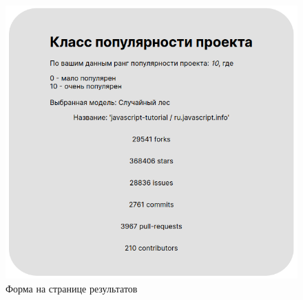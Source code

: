 \begin{figure}[H]
    \centering
    \includegraphics[width=1\linewidth]{pic/result.png}
    \vspace{-0.5em}    \caption{Форма на странице результатов}
    \label{ris:result}
\end{figure}
\vspace{1em}